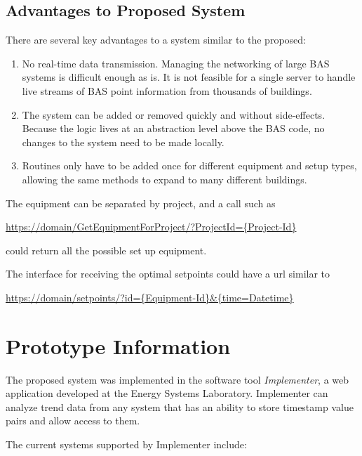 \subsection{Advantages to Proposed System}

There are several key advantages to a system similar to the proposed:

\begin{enumerate}
    \item No real-time data transmission. Managing the networking of
        large BAS systems is difficult enough as is. It is not feasible
        for a single server to handle live streams of BAS point
        information from thousands of buildings. 

    \item The system can be added or removed quickly and without
        side-effects. Because the logic lives at an abstraction level
        above the BAS code, no changes to the system need to be made
        locally. 

    \item Routines only have to be added once for different equipment
        and setup types, allowing the same methods to expand to many
        different buildings. 
\end{enumerate}

The equipment can be separated by project, and a call such as

\url{https://domain/GetEquipmentForProject/?ProjectId={Project-Id}}

could return all the possible set up equipment.

The interface for receiving the optimal setpoints could have a url
similar to 

\url{https://domain/setpoints/?id={Equipment-Id}\&{time=Datetime}}

\section{Prototype Information}

The proposed system was implemented in the software tool
\textit{Implementer}, a web application developed at the Energy Systems
Laboratory. Implementer can analyze trend data from any system that has
an ability to store timestamp value pairs and allow access to them. 

The current systems supported by Implementer include:

